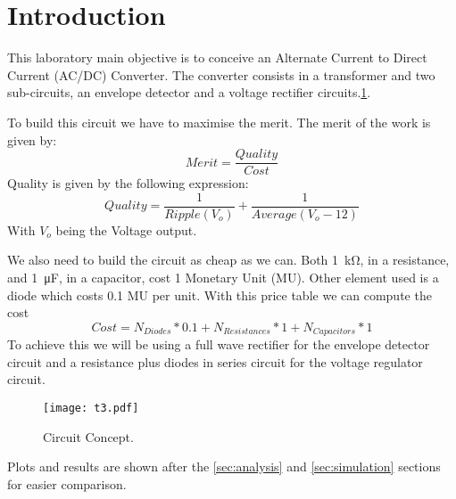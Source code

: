 \section{Introduction}

This laboratory main objective is to conceive an Alternate Current to Direct Current (AC/DC) Converter. The converter consists in a transformer and two sub-circuits, an envelope detector and a voltage rectifier circuits.\ref{Fig1: circuit}.

To build this circuit we have to maximise the merit. The merit of the work is given by:
\begin{equation}
    Merit = \dfrac{Quality}{Cost}
\end{equation}
Quality is given by the following expression:
\begin{equation}
    Quality = \dfrac{1}{Ripple(V_o)} + \dfrac{1}{Average(V_o-12)} 
\end{equation}
With $V_o$ being the Voltage output.

We also need to build the circuit as cheap as we can. Both \SI{1}{\kilo\ohm}, in a resistance, and \SI{1}{\micro\farad}, in a capacitor, cost 1 Monetary Unit (MU). Other element used is a diode which costs 0.1 MU per unit.
With this price table we can compute the cost
\begin{equation}
    Cost = N_{Diodes}*0.1+N_{Resistances}*1+N_{Capacitors}*1
\end{equation}
To achieve this we will be using a full wave rectifier for the envelope detector circuit and a resistance plus diodes in series circuit for the voltage regulator circuit.

\begin{figure}[h] 
\centering
\texttt{[image: t3.pdf]}
\caption{Circuit Concept.}
\label{Fig1: circuit}
\end{figure}

Plots and results are shown after the \ref{sec:analysis} and \ref{sec:simulation} sections for easier comparison.
